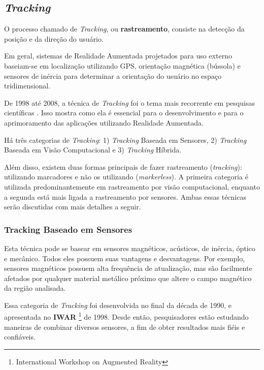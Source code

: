 \subsection{\textit{Tracking}}

O processo chamado de \textit{Tracking}, ou \textbf{rastreamento}, consiste na detecção da posição e da direção
do usuário. 


Em geral, sistemas de Realidade Aumentada projetados para uso externo baseiam-se em localização
utilizando \gls{GPS}, orientação magnética (bússola) e sensores de inércia para determinar a 
orientação do usuário no espaço tridimensional. 

De 1998 até 2008, a técnica de \textit{Tracking} foi o tema mais recorrente em pesquisas científicas
\cite{TrendsInAR}. Isso mostra como ela é essencial para o desenvolvimento e para o
aprimoramento das aplicações utilizando Realidade Aumentada.


Há três categorias de \textit{Tracking}: 1) \textit{Tracking} Baseada em Sensores,
2) \textit{Tracking} Baseada em Visão Computacional e 3) \textit{Tracking} Híbrida.

Além disso, existem duas formas principais de fazer rastreamento (\textit{tracking}): utilizando
marcadores e não os utilizando (\textit{markerless}). A primeira categoria é utilizada
predominantemente em rastreamento por visão computacional, enquanto a segunda está mais ligada
a rastreamento por sensores. Ambas essas técnicas serão discutidas com mais detalhes a seguir.




\subsubsection{Tracking Baseado em Sensores}

Esta técnica pode se basear em sensores magnéticos, acústicos, 
de inércia, óptico e mecânico. Todos eles possuem suas vantagens
e desvantagens. Por exemplo, sensores magnéticos possuem alta frequência de atualização,
mas são facilmente afetados por qualquer material metálico próximo que altere o campo 
magnético da região analisada. 

Essa categoria de \textit{Tracking} foi desenvolvida no final da década de 1990, e apresentada
no \textbf{IWAR}
\footnote{International Workshop on Augmented Reality} 
de 1998. Desde então, pesquisadores estão estudando maneiras de combinar diversos
sensores, a fim de obter resultados mais fiéis e confiáveis.


